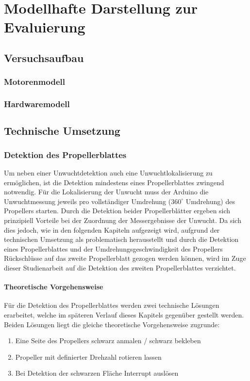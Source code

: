 
\chapter{Modellhafte Darstellung zur Evaluierung}

\section{Versuchsaufbau}

\subsection{Motorenmodell}

\subsection{Hardwaremodell}
\label{subsec:hardwaremodell}

\section{Technische Umsetzung}

\subsection{Detektion des Propellerblattes}
Um neben einer Unwuchtdetektion auch eine Unwuchtlokalisierung zu ermöglichen, ist die Detektion mindestens eines Propellerblattes zwingend notwendig.
Für die Lokalisierung der Unwucht muss der Arduino die Unwuchtmessung jeweils pro vollständiger Umdrehung ($360^\circ$ Umdrehung) des Propellers starten.
Durch die Detektion beider Propellerblätter ergeben sich prinzipiell Vorteile bei der Zuordnung der Messergebnisse der Unwucht. 
Da sich dies jedoch, wie in den folgenden Kapiteln aufgezeigt wird, aufgrund der technischen Umsetzung als problematisch herausstellt und durch die Detektion eines Propellerblattes und der Umdrehungsgeschwindigkeit des Propellers Rückschlüsse auf das zweite Propellerblatt gezogen werden können, wird im Zuge dieser Studienarbeit auf die Detektion des zweiten Propellerblattes verzichtet.

\subsubsection*{Theoretische Vorgehensweise}
Für die Detektion des Propellerblattes werden zwei technische Lösungen erarbeitet, welche im späteren Verlauf dieses Kapitels gegenüber gestellt werden.
Beiden Lösungen liegt die gleiche theoretische Vorgehensweise zugrunde:
\begin{enumerate}
	\item Eine Seite des Propellers schwarz anmalen / schwarz bekleben
	\item Propeller mit definierter Drehzahl rotieren lassen
	\item Bei Detektion der schwarzen Fläche Interrupt auslösen
\end{enumerate}


